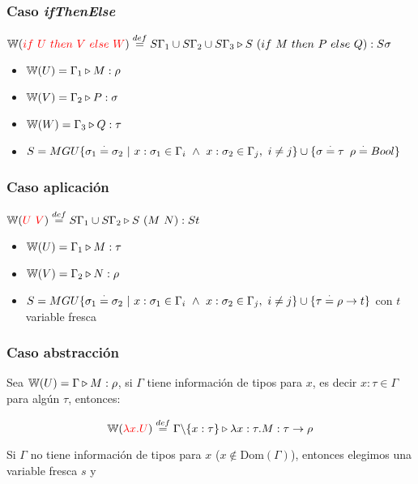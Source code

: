\documentclass[10pt,a4paper]{article}
\begin{document}
\subsubsection*{Caso \textit{ifThenElse}}
$\mathbb{W}({\color{red}if~ U~ then~ V~ else~ W}) \overset{def}{=} S\Gamma_1\cup S\Gamma_2\cup S\Gamma_3\triangleright S~(if~ M~ then~ P~ else~ Q) : S\sigma$
\begin{centrado}
\begin{itemize}
\item $\mathbb{W}(U) = \Gamma_1\triangleright M : \rho$
\item $\mathbb{W}(V) = \Gamma_2\triangleright P : \sigma$
\item $\mathbb{W}(W) = \Gamma_3\triangleright Q : \tau$
\item $S = MGU\{\sigma_1\overset{\cdot}{=} \sigma_2~|~x:\sigma_1\in\Gamma_i~\land~x:\sigma_2\in\Gamma_j,~i\neq j\}\cup\{\sigma\overset{\cdot}{=}\tau\,~\rho\overset{\cdot}{=} Bool\}$
\end{itemize}
\end{centrado}

\subsubsection*{Caso aplicación}
$\mathbb{W}({\color{red}U~V}) \overset{def}{=} S\Gamma_1\cup S\Gamma_2\triangleright S~(M~N) : St$
\begin{centrado}
\begin{itemize}
\item $\mathbb{W}(U) = \Gamma_1\triangleright M : \tau$
\item $\mathbb{W}(V) = \Gamma_2\triangleright N : \rho$
\item $S = MGU\{\sigma_1\overset{\cdot}{=} \sigma_2~|~x:\sigma_1\in\Gamma_i~\land~x:\sigma_2\in\Gamma_j,~i\neq j\}\cup\{\tau\overset{\cdot}{=}\rho\to t\}$ con $t$ variable fresca
\end{itemize}
\end{centrado}

\subsubsection*{Caso abstracción}
Sea $\mathbb{W}(U) = \Gamma\triangleright M : \rho$, si $\Gamma$ tiene información de tipos para $x$, es decir $x:\tau\in\Gamma$ para algún $\tau$, entonces:

$$\mathbb{W}({\color{red}\lambda x. U}) \overset{def}{=} \Gamma \backslash\{x:\tau\}\triangleright \lambda x: \tau . M : \tau\to\rho$$

Si $\Gamma$ no tiene información de tipos para $x$ ($x\notin \text{Dom}(\Gamma)$), entonces elegimos una variable fresca $s$ y
\end{document}
